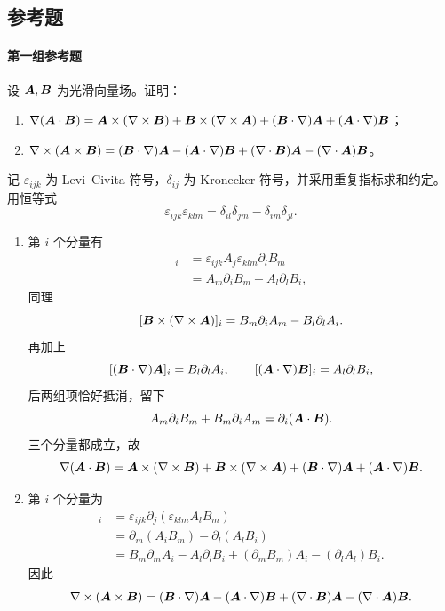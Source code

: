 \subsection{参考题}

\paragraph{第一组参考题}

\begin{xreferenceproblem}[1]
设 $\bm{A},\bm{B}$ 为光滑向量场。证明：
\begin{enumerate}[label=(\arabic*)]
  \item $\nabla(\bm{A}\cdot\bm{B})=\bm{A}\times(\nabla\times\bm{B})+\bm{B}\times(\nabla\times\bm{A})+(\bm{B}\cdot\nabla)\bm{A}+(\bm{A}\cdot\nabla)\bm{B}$；
  \item $\nabla\times(\bm{A}\times\bm{B})=(\bm{B}\cdot\nabla)\bm{A}-(\bm{A}\cdot\nabla)\bm{B}+(\nabla\cdot\bm{B})\bm{A}-(\nabla\cdot\bm{A})\bm{B}$。
\end{enumerate}
\end{xreferenceproblem}
\begin{xsolution}
记 $\varepsilon_{ijk}$ 为 Levi--Civita 符号，$\delta_{ij}$ 为 Kronecker 符号，并采用重复指标求和约定。用恒等式
\[
  \varepsilon_{ijk}\varepsilon_{klm}
  =\delta_{il}\delta_{jm}-\delta_{im}\delta_{jl}.
\]

\begin{enumerate}[label=(\arabic*)]
  \item 第 $i$ 个分量有
  \begin{align*}
    [\vect{A}\times(\nabla\times\vect{B})]_i
    &=\varepsilon_{ijk}A_j\varepsilon_{klm}\partial_lB_m\\
    &=A_m\partial_iB_m-A_l\partial_lB_i,
  \end{align*}
  同理
  \[
    [\bm{B}\times(\nabla\times\bm{A})]_i
    =B_m\partial_iA_m-B_l\partial_lA_i.
  \]
  再加上
  \[
    [(\bm{B}\cdot\nabla)\bm{A}]_i=B_l\partial_lA_i,
    \qquad
    [(\bm{A}\cdot\nabla)\bm{B}]_i=A_l\partial_lB_i,
  \]
  后两组项恰好抵消，留下
  \[
    A_m\partial_iB_m+B_m\partial_iA_m
    =\partial_i(\bm{A}\cdot\bm{B}).
  \]
  三个分量都成立，故
  \[
    \nabla(\bm{A}\cdot\bm{B})
    =\bm{A}\times(\nabla\times\bm{B})
    +\bm{B}\times(\nabla\times\bm{A})
    +(\bm{B}\cdot\nabla)\bm{A}
    +(\bm{A}\cdot\nabla)\bm{B}.
  \]

  \item 第 $i$ 个分量为
  \begin{align*}
    [\nabla\times(\vect{A}\times\vect{B})]_i
    &=\varepsilon_{ijk}\partial_j(\varepsilon_{klm}A_lB_m)\\
    &=\partial_m(A_iB_m)-\partial_l(A_lB_i)\\
    &=B_m\partial_mA_i-A_l\partial_lB_i
      +(\partial_mB_m)A_i-(\partial_lA_l)B_i.
  \end{align*}
  因此
  \[
    \nabla\times(\bm{A}\times\bm{B})
    =(\bm{B}\cdot\nabla)\bm{A}
    -(\bm{A}\cdot\nabla)\bm{B}
    +(\nabla\cdot\bm{B})\bm{A}
    -(\nabla\cdot\bm{A})\bm{B}.
  \]
\end{enumerate}
\end{xsolution}


